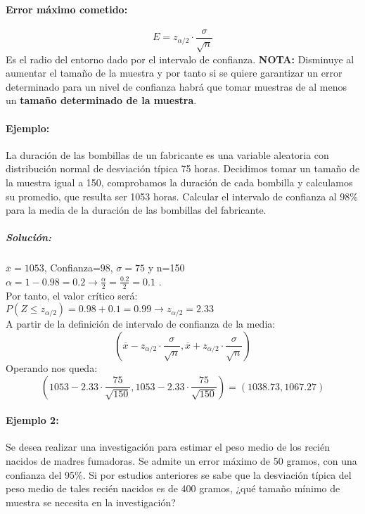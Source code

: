 \paragraph{Error máximo cometido:} $$E=z_{\alpha / 2}\cdot \frac{\sigma}{\sqrt{n}}$$
Es el radio del entorno dado por el intervalo de confianza. \textbf{NOTA:} Disminuye al aumentar el tamaño de la muestra y por tanto si se quiere garantizar un error determinado para un nivel de confianza habrá que tomar muestras de al menos un \textbf{tamaño determinado de la muestra}. 

\paragraph{Ejemplo:} La duración de las bombillas de un fabricante es una variable aleatoria con distribución
normal de desviación típica 75 horas. Decidimos tomar un tamaño de la muestra igual a 150, comprobamos la duración de cada
bombilla y calculamos su promedio, que resulta ser 1053 horas. Calcular el intervalo de confianza al 98\%
para la media de la duración de las bombillas del fabricante.\\

\subparagraph{Solución:}$\overline{x}=1053$, Confianza=$98$, $\sigma=75$ y n=150 \\
$\alpha=1-0.98=0.2 \to \frac{\alpha}{2}=\frac{0.2}{2}=0.1$
. \\ Por tanto, el valor crítico será: \\
$P\left(Z \leqslant z_{\alpha / 2} \right)= 0.98 + 0.1 = 0.99 \to z_{\alpha / 2} = 2.33$\\ 
 
A partir de la definición de intervalo de confianza de la media:
$$ \left( \overline{x} - z_{\alpha / 2}\cdot \frac{\sigma}{\sqrt{n}} ,  \overline{x} + z_{\alpha / 2}\cdot \frac{\sigma}{\sqrt{n}}
\right)$$
Operando nos queda: \\
$$ \left( 1053 - 2.33 \cdot \frac{75}{\sqrt{150}} ,  1053 - 2.33 \cdot \frac{75}{\sqrt{150}}
\right)=\left(1038.73 ,  1067.27\right)
$$

\paragraph{Ejemplo 2:} Se desea realizar una investigación para estimar el peso medio de los recién nacidos de madres fumadoras. Se admite un error máximo de 50 gramos, con una confianza del 95\%. Si por estudios anteriores se sabe que la desviación típica del peso medio de tales recién nacidos es de 400 gramos, ¿qué tamaño mínimo de muestra se necesita en la investigación?\\

